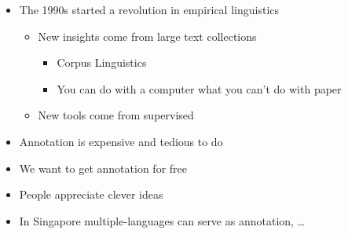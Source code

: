 \documentclass[a4paper,landscape,headrule,footrule,xetex]{foils}
\begin{document}
\MyLogo{}
\begin{itemize}
\item The 1990s started a revolution in empirical linguistics
  \begin{itemize}
  \item New insights come from  large text collections
    \begin{itemize}
    \item Corpus Linguistics
    \item You can do with a computer what you can't do with paper
    \end{itemize}
  \item New tools come from supervised 
  \end{itemize}
\item Annotation is expensive and tedious to do
\item We want to get annotation for free
\item People appreciate clever ideas
\item In Singapore multiple-languages can serve as annotation, \ldots
\end{itemize}


\end{document}
